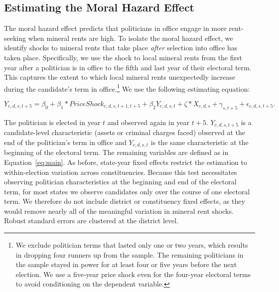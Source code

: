 \documentclass[12pt,letterpaper]{article}
\begin{document}
\subsection{Estimating the Moral Hazard Effect}

The moral hazard effect predicts that politicians in office engage in
more rent-seeking when mineral rents are high. To isolate the moral
hazard effect, we identify shocks to mineral rents that take place
\textit{after} selection into office has taken place. Specifically, we
use the shock to local mineral rents from the first year after a
politician is in office to the fifth and last year of their electoral
term. This captures the extent to which local mineral rents
unexpectedly increase during the candidate's term in
office.\footnote{We exclude politician terms that lasted only one or
  two years, which results in dropping four runners up from the
  sample. The remaining politicians in the sample stayed in power for
  at least four or five years before the next election. We use a
  five-year price shock even for the four-year electoral terms to
  avoid conditioning on the dependent variable.} We use the following
estimating equation:

\begin{equation}
  \label{eq:ts}
  Y_{c,d,s,t+5} = \beta_0 + \beta_1 * PriceShock_{c,d,s,t+1,t+5} + \beta_2 Y_{c,d,s,t} + 
  \zeta*X_{c,d,s} + \gamma_{s,t+5} + \epsilon_{c,d,s,t+5}\text{.}
\end{equation}

\noindent The politician is elected in year $t$ and observed again in
year $t+5$.  $Y_{c,d,s,t+5}$ is a candidate-level characteristic
(assets or criminal charges faced) observed at the end of the
politician's term in office and $Y_{c,d,s,t}$ is the same
characteristic at the beginning of the electoral term. The remaining
variables are defined as in Equation~\ref{eq:main}. As before,
state-year fixed effects restrict the estimation to within-election
variation across constituencies. Because this test necessitates
observing politician characteristics at the beginning and end of the
electoral term, for most states we observe candidates only over the
course of one electoral term. We therefore do not include district or
constituency fixed effects, as they would remove nearly all of the
meaningful variation in mineral rent shocks. Robust standard errors
are clustered at the district level.
\end{document}
